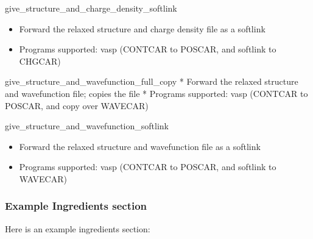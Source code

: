 \documentclass[letterpaper,10pt,english]{sphinxmanual}
\begin{document}
give\_structure\_and\_charge\_density\_softlink
\begin{itemize}
\item {} 
Forward the relaxed structure and charge density file as a softlink

\item {} 
Programs supported: vasp (CONTCAR to POSCAR, and softlink to CHGCAR)

\end{itemize}

give\_structure\_and\_wavefunction\_full\_copy
*  Forward the relaxed structure and wavefunction file; copies the file
*  Programs supported: vasp (CONTCAR to POSCAR, and copy over WAVECAR)

give\_structure\_and\_wavefunction\_softlink
\begin{itemize}
\item {} 
Forward the relaxed structure and wavefunction file as a softlink

\item {} 
Programs supported: vasp (CONTCAR to POSCAR, and softlink to WAVECAR)

\end{itemize}


\subsubsection{Example Ingredients section}
\label{3_0_inputfile:example-ingredients-section}
Here is an example ingredients section:
\end{document}
